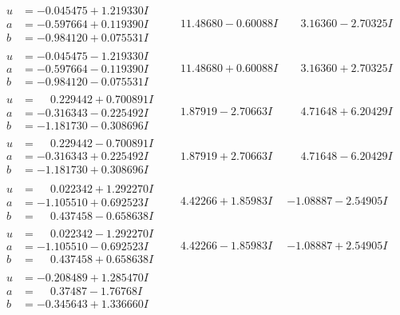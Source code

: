 \documentclass[1p]{elsarticle_modified}
\theoremstyle{definition}
\begin{document}
$$\begin{array}{c|c|c}
\begin{aligned}
u &= -0.045475 + 1.219330 I \\
a &= -0.597664 + 0.119390 I \\
b &= -0.984120 + 0.075531 I\end{aligned}
 & \phantom{-}11.48680 - 0.60088 I & \phantom{-}3.16360 - 2.70325 I \\ \hline\begin{aligned}
u &= -0.045475 - 1.219330 I \\
a &= -0.597664 - 0.119390 I \\
b &= -0.984120 - 0.075531 I\end{aligned}
 & \phantom{-}11.48680 + 0.60088 I & \phantom{-}3.16360 + 2.70325 I \\ \hline\begin{aligned}
u &= \phantom{-}0.229442 + 0.700891 I \\
a &= -0.316343 - 0.225492 I \\
b &= -1.181730 - 0.308696 I\end{aligned}
 & \phantom{-}1.87919 - 2.70663 I & \phantom{-}4.71648 + 6.20429 I \\ \hline\begin{aligned}
u &= \phantom{-}0.229442 - 0.700891 I \\
a &= -0.316343 + 0.225492 I \\
b &= -1.181730 + 0.308696 I\end{aligned}
 & \phantom{-}1.87919 + 2.70663 I & \phantom{-}4.71648 - 6.20429 I \\ \hline\begin{aligned}
u &= \phantom{-}0.022342 + 1.292270 I \\
a &= -1.105510 + 0.692523 I \\
b &= \phantom{-}0.437458 - 0.658638 I\end{aligned}
 & \phantom{-}4.42266 + 1.85983 I & -1.08887 - 2.54905 I \\ \hline\begin{aligned}
u &= \phantom{-}0.022342 - 1.292270 I \\
a &= -1.105510 - 0.692523 I \\
b &= \phantom{-}0.437458 + 0.658638 I\end{aligned}
 & \phantom{-}4.42266 - 1.85983 I & -1.08887 + 2.54905 I \\ \hline\begin{aligned}
u &= -0.208489 + 1.285470 I \\
a &= \phantom{-}0.37487 - 1.76768 I \\
b &= -0.345643 + 1.336660 I\end{aligned}

\end{array}$$
\end{document}
